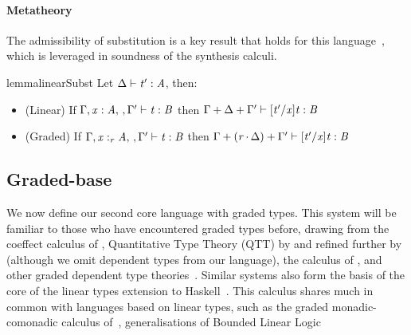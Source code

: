 \paragraph{Metatheory}
The admissibility of substitution is a key result that holds
for this language~\cite{DBLP:journals/pacmpl/OrchardLE19}, which is
leveraged in soundness of the synthesis calculi.
%
\begin{restatable}{lemma}{linearSubst}
Let $\Delta  \vdash  \mathit{t'}  :  \mathit{A}$, then:
\label{lemma:substitution}
\begin{itemize}[leftmargin=1em]
\item (Linear) \hspace{0.04em} If $\Gamma  ,   \mathit{x}  :  \mathit{A}    ,  \,  ,   \Gamma'   \vdash  \mathit{t}  :  \mathit{B}$ then $\Gamma  +  \Delta  +  \Gamma'  \vdash   [  \mathit{t'}  /  \mathit{x}  ]  \mathit{t}   :  \mathit{B}$
\item (Graded) If $\Gamma  \GRANULEsym{,}   \GRANULEmv{x}  :_{\textcolor{coeffectColor}{  \GRANULEnt{r}  } }   \GRANULEnt{A}    \GRANULEsym{,}  \,  \GRANULEsym{,}   \Gamma'   \vdash  \GRANULEnt{t}  :  \GRANULEnt{B}$
then $\Gamma  \GRANULEsym{+}  \GRANULEsym{(}   \textcolor{coeffectColor}{ \GRANULEnt{r}   \textcolor{coeffectColor}{\,\cdot\,} }  \Delta   \GRANULEsym{)}  \GRANULEsym{+}  \Gamma'  \vdash   [  \GRANULEnt{t'}  /  \GRANULEmv{x}  ]  \GRANULEnt{t}   :  \GRANULEnt{B}$
\end{itemize}
\end{restatable}


\subsection{Graded-base}
\label{sec:graded-base}

We now define our second core language with graded types. This system will be familiar to
those who have encountered graded types before, drawing from the coeffect calculus of \citet{petricek2014coeffects}, Quantitative Type Theory (QTT) by \citet{McBride2016} and refined further by \citet{quantitative-type-theory} (although we omit dependent types from our language), the calculus of \citet{DBLP:journals/pacmpl/AbelB20}, and other graded dependent type theories~\cite{quantitative-type-theory,DBLP:conf/esop/MoonEO21}. Similar
systems also form the basis of the core of the linear types extension to Haskell~\cite{DBLP:journals/pacmpl/BernardyBNJS18}.
This calculus shares much in common with languages based on linear types, such
as the graded monadic-comonadic calculus of~\cite{combining2016}, generalisations of Bounded
Linear Logic~\cite{DBLP:conf/esop/BrunelGMZ14,DBLP:conf/esop/GhicaS14}


